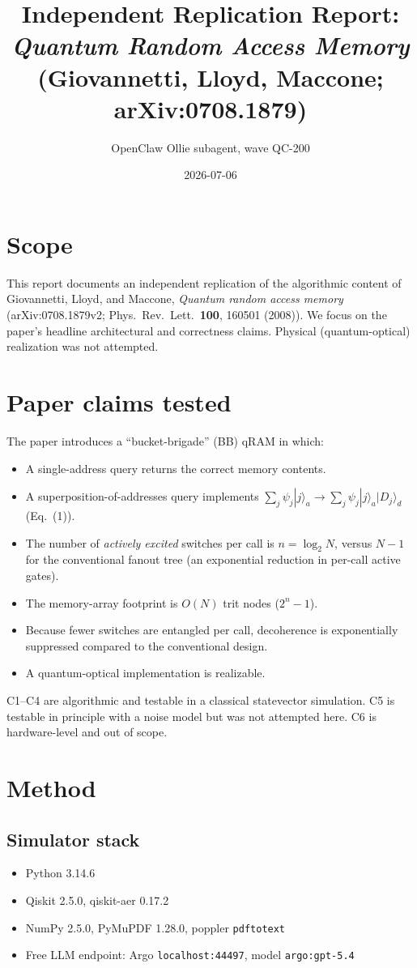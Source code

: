 \documentclass[11pt]{article}
\title{Independent Replication Report:\\
       \emph{Quantum Random Access Memory} (Giovannetti, Lloyd, Maccone; arXiv:0708.1879)}
\author{OpenClaw Ollie subagent, wave QC-200}
\date{2026-07-06}
\begin{document}
\maketitle

\section{Scope}
This report documents an independent replication of the algorithmic content of
Giovannetti, Lloyd, and Maccone, \emph{Quantum random access memory} (arXiv:0708.1879v2;
Phys.\ Rev.\ Lett.\ \textbf{100}, 160501 (2008)). We focus on the paper's headline
architectural and correctness claims. Physical (quantum-optical) realization
was not attempted.

\section{Paper claims tested}
The paper introduces a ``bucket-brigade'' (BB) qRAM in which:
\begin{itemize}
  \item[C1] A single-address query returns the correct memory contents.
  \item[C2] A superposition-of-addresses query implements
    $\sum_j \psi_j |j\rangle_a \to \sum_j \psi_j |j\rangle_a |D_j\rangle_d$ (Eq.~(1)).
  \item[C3] The number of \emph{actively excited} switches per call is
    $n = \log_2 N$, versus $N-1$ for the conventional fanout tree
    (an exponential reduction in per-call active gates).
  \item[C4] The memory-array footprint is $O(N)$ trit nodes ($2^n - 1$).
  \item[C5] Because fewer switches are entangled per call, decoherence is
    exponentially suppressed compared to the conventional design.
  \item[C6] A quantum-optical implementation is realizable.
\end{itemize}
C1--C4 are algorithmic and testable in a classical statevector simulation.
C5 is testable in principle with a noise model but was not attempted here.
C6 is hardware-level and out of scope.

\section{Method}
\subsection{Simulator stack}
\begin{itemize}
  \item Python 3.14.6
  \item Qiskit 2.5.0, qiskit-aer 0.17.2
  \item NumPy 2.5.0, PyMuPDF 1.28.0, poppler \texttt{pdftotext}
  \item Free LLM endpoint: Argo \texttt{localhost:44497}, model \texttt{argo:gpt-5.4}
\end{itemize}
\end{document}
